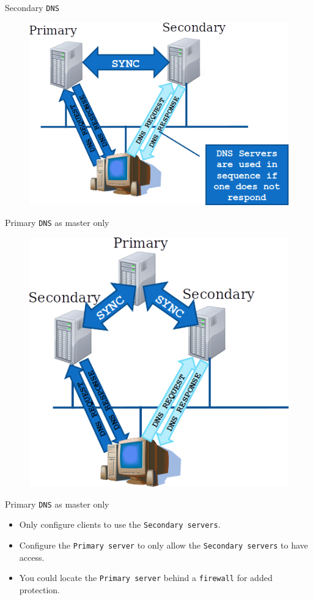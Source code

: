 \documentclass{beamer}
\begin{document}
\begin{frame}{Secondary \texttt{DNS}}
  \begin{figure}
    \begin{center}
      \includegraphics[width=0.9\linewidth]{secondarydns.png}
    \end{center}
  \end{figure}
\end{frame}

\begin{frame}{Primary \texttt{DNS} as master only}
  \begin{figure}
    \begin{center}
      \includegraphics[width=0.65\linewidth]{masteronlydns.png}
    \end{center}
  \end{figure}
\end{frame}

\begin{frame}{Primary \texttt{DNS} as master only}
  \begin{tcolorbox}[title={\textbf{SECURITY:}}]
    \begin{itemize}
      \item Only configure clients to use the \texttt{Secondary servers}.
      \item Configure the \texttt{Primary server} to only allow the \texttt{Secondary servers} to have access.
      \item You could locate the \texttt{Primary server} behind a \texttt{firewall} for added protection.  
    \end{itemize}
  \end{tcolorbox}
\end{frame}
\end{document}
